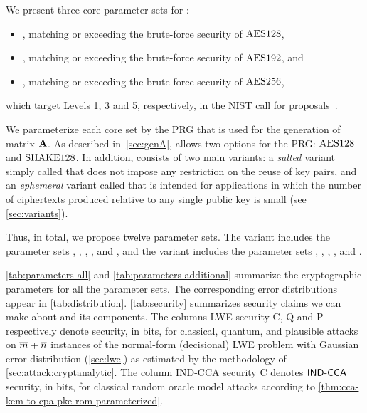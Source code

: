 We present three core parameter sets for \FrodoKEM:
\begin{itemize}
\item \FrodoLOne, matching or exceeding the brute-force security of $\textrm{\upshape\mdseries AES128}$,
\item \FrodoLThree, matching or exceeding the brute-force security of $\textrm{\upshape\mdseries AES192}$, and
\item \FrodoLFive, matching or exceeding the brute-force security of $\textrm{\upshape\mdseries AES256}$,
\end{itemize}
\noindent which target Levels 1, 3 and 5, respectively,
in the NIST call for proposals~\cite{NIST17}.

We parameterize each core set by the PRG that is used for the generation
of matrix $\mathbf{A}$. 
As described in~\autoref{sec:genA}, \FrodoKEM allows two options for the PRG:
$\textrm{\upshape\mdseries AES128}$ and $\textrm{\upshape\mdseries SHAKE}128$. 
In addition, \FrodoKEM consists of two main variants: a \emph{salted} variant simply
called \FrodoKEM that does not impose any restriction on the reuse of key pairs,
and an \emph{ephemeral} variant called \eFrodoKEM that is intended for applications
in which the number of ciphertexts produced relative to any single public key is small (see \autoref{sec:variants}).

Thus, in total, we propose twelve parameter sets. The variant \FrodoKEM includes the
parameter sets \FrodoKEMLOneAES, \FrodoKEMLThreeAES, \FrodoKEMLFiveAES,
\FrodoKEMLOneSHAKE, \FrodoKEMLThreeSHAKE and \FrodoKEMLFiveSHAKE, and the variant \eFrodoKEM
includes the parameter sets \eFrodoKEMLOneAES, \eFrodoKEMLThreeAES, \eFrodoKEMLFiveAES,
\eFrodoKEMLOneSHAKE, \eFrodoKEMLThreeSHAKE and \eFrodoKEMLFiveSHAKE.

\autoref{tab:parameters-all} and \autoref{tab:parameters-additional} summarize
the cryptographic parameters for all the parameter sets.
The corresponding error distributions appear in \autoref{tab:distribution}.
\autoref{tab:security} summarizes security claims we can make about \FrodoKEM
and its components. The columns LWE security C, Q and P respectively denote
security, in bits, for classical, quantum, and plausible attacks on $\overline{m}+\overline{n}$
instances of the normal-form (decisional) LWE problem with Gaussian error
distribution (\autoref{sec:lwe}) as estimated by the methodology of
\autoref{sec:attack:cryptanalytic}. The column IND-CCA security C denotes $\textsf{\upshape\mdseries IND-CCA}$
security, in bits, for classical random oracle model attacks according to
\autoref{thm:cca-kem-to-cpa-pke-rom-parameterized}.

